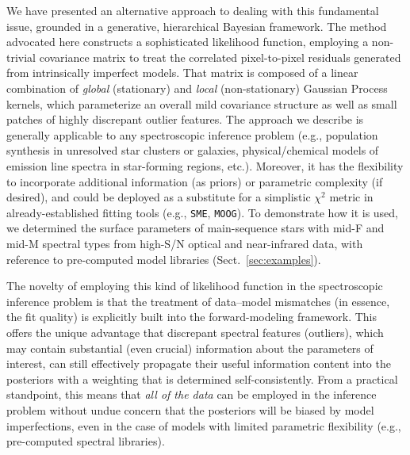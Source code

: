 \documentclass[iop,floatfix]{emulateapj}
\begin{document}
We have presented an alternative approach to dealing with this fundamental issue, grounded in a 
generative, hierarchical Bayesian framework.  The method advocated here constructs a sophisticated 
likelihood function, employing a non-trivial covariance matrix to treat the correlated 
pixel-to-pixel residuals generated from intrinsically imperfect models.  That matrix is composed of 
a linear combination of {\it global} (stationary) and {\it local} (non-stationary) Gaussian 
Process kernels, which parameterize an overall mild covariance structure as well as small patches 
of highly discrepant outlier features.  The approach we describe is generally applicable to any 
spectroscopic inference problem (e.g., population synthesis in unresolved star clusters or 
galaxies, physical/chemical models of emission line spectra in star-forming regions, etc.).  
Moreover, it has the flexibility to incorporate additional information (as priors) or parametric 
complexity (if desired), and could be deployed as a substitute for a simplistic $\chi^2$ metric in 
already-established fitting tools (e.g., {\tt SME}, {\tt MOOG}).  To demonstrate how it is used, we 
determined the surface parameters of main-sequence stars with mid-F and mid-M spectral types from 
high-S/N optical and near-infrared data, with reference to pre-computed model libraries 
(Sect.~\ref{sec:examples}).

The novelty of employing this kind of likelihood function in the spectroscopic inference problem is 
that the treatment of data--model mismatches (in essence, the fit quality) is explicitly built into 
the forward-modeling framework.  This offers the unique advantage that discrepant spectral features 
(outliers), which may contain substantial (even crucial) information about the parameters of 
interest, can still effectively propagate their useful information content into the posteriors with 
a weighting that is determined self-consistently.  From a practical standpoint, this means that 
{\it all of the data} can be employed in the inference problem without undue concern that the 
posteriors will be biased by model imperfections, even in the case of models with limited 
parametric flexibility (e.g., pre-computed spectral libraries).
\end{document}
